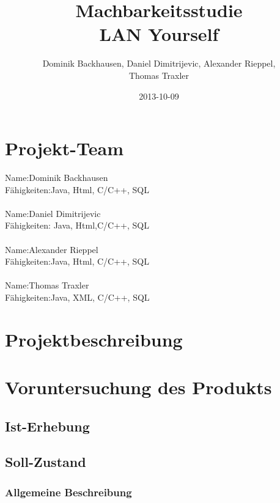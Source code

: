 \documentclass[a4paper,12pt]{scrreprt}
\begin{document}
\author{Dominik Backhausen, Daniel Dimitrijevic, Alexander Rieppel,\\ Thomas Traxler}
\title{Machbarkeitsstudie\\ LAN Yourself}
\date{2013-10-09}
\maketitle
\tableofcontents



\chapter{Projekt-Team}
	
	Name:Dominik Backhausen\\
	    Fähigkeiten:Java, Html, C/C++, SQL\\\\
	  	Name:Daniel Dimitrijevic
	\\ 	Fähigkeiten: Java, Html,C/C++, SQL    
	\\
	\\  Name:Alexander Rieppel
	\\
	    Fähigkeiten:Java, Html, C/C++, SQL
	    \\
	    \\
	    Name:Thomas Traxler
	    \\
	    Fähigkeiten:Java, XML, C/C++, SQL
	    \\
\chapter{Projektbeschreibung}


\chapter{Voruntersuchung des Produkts}
	\section{Ist-Erhebung}
	
	
	\section{Soll-Zustand}
		
		\subsection{Allgemeine Beschreibung}
			
\end{document}
